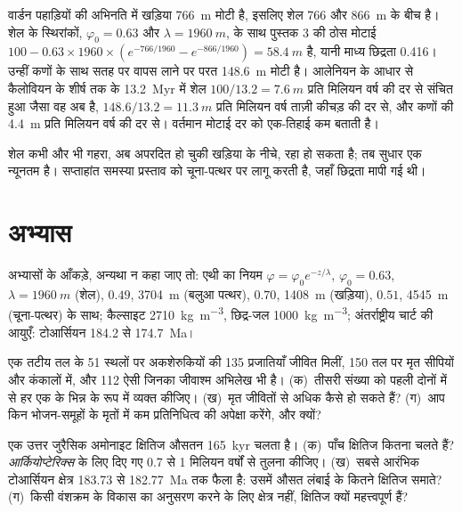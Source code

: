 \begin{example}[वार्डन शेल]\label{ex:b2:palaeoenvironments:shale}
वार्डन पहाड़ियों की अभिनति में खड़िया \qty{766}{m} मोटी है, इसलिए शेल
766 और \qty{866}{m} के बीच है। शेल के स्थिरांकों, $\varphi_0 = 0.63$ और $\lambda =
\qty{1960}{m}$, के साथ पुस्तक 3 की ठोस मोटाई $100 - 0.63 \times 1960 \times
(e^{-766/1960} - e^{-866/1960}) = \qty{58.4}{m}$ है, यानी माध्य छिद्रता 0.416। उन्हीं कणों के साथ
सतह पर वापस लाने पर परत \qty{148.6}{m} मोटी है। आलेनियन के आधार से कैलोवियन के शीर्ष तक के
\qty{13.2}{Myr} में शेल $100/13.2 =
\qty{7.6}{m}$ प्रति मिलियन वर्ष की दर से संचित हुआ जैसा वह अब है, $148.6/13.2 = \qty{11.3}{m}$ प्रति मिलियन
वर्ष ताज़ी कीचड़ की दर से, और कणों की \qty{4.4}{m} प्रति मिलियन वर्ष की दर से। वर्तमान मोटाई
दर को एक-तिहाई कम बताती है।
\end{example}

शेल कभी और भी गहरा, अब अपरदित हो चुकी खड़िया के नीचे, रहा हो सकता है; तब सुधार एक
न्यूनतम है। सप्ताहांत समस्या प्रस्ताव को चूना-पत्थर पर लागू करती है, जहाँ छिद्रता
मापी गई थी।

\section*{अभ्यास}\label{sec:b2:palaeoenvironments:exercises}

अभ्यासों के आँकड़े, अन्यथा न कहा जाए तो: एथी का नियम $\varphi = \varphi_0 e^{-z/\lambda}$,
$\varphi_0 = 0.63$, $\lambda = \qty{1960}{m}$ (शेल), $0.49$, \qty{3704}{m} (बलुआ पत्थर),
$0.70$, \qty{1408}{m} (खड़िया), $0.51$, \qty{4545}{m} (चूना-पत्थर) के साथ; कैल्साइट \qty{2710}{kg.m^{-3}},
छिद्र-जल \qty{1000}{kg.m^{-3}}; अंतर्राष्ट्रीय चार्ट की आयुएँ: टोआर्सियन 184.2 से
\qty{174.7}{Ma}।

\begin{exercise}[$\star$]\label{exo:b2:palaeoenvironments:1}
एक तटीय तल के 51 स्थलों पर अकशेरुकियों की 135 प्रजातियाँ जीवित मिलीं, 150 तल पर मृत
सीपियों और कंकालों में, और 112 ऐसी जिनका जीवाश्म अभिलेख भी है। (क)~तीसरी
संख्या को पहली दोनों में से हर एक के भिन्न के रूप में व्यक्त कीजिए। (ख)~मृत जीवितों से अधिक कैसे हो सकते हैं? (ग)~आप
किन भोजन-समूहों के मृतों में कम प्रतिनिधित्व की अपेक्षा करेंगे, और क्यों?
\end{exercise}

\begin{exercise}[$\star$]\label{exo:b2:palaeoenvironments:2}
एक उत्तर जुरैसिक अमोनाइट क्षितिज औसतन \qty{165}{kyr} चलता है। (क)~पाँच क्षितिज कितना
चलते हैं? \emph{आर्कियोप्टेरिक्स} के लिए दिए गए 0.7 से 1 मिलियन वर्षों से तुलना कीजिए। (ख)~सबसे आरंभिक
टोआर्सियन क्षेत्र 183.73 से \qty{182.77}{Ma} तक फैला है: उसमें औसत लंबाई के कितने क्षितिज समाते?
(ग)~किसी वंशक्रम के विकास का अनुसरण करने के लिए क्षेत्र नहीं, क्षितिज क्यों महत्त्वपूर्ण हैं?
\end{exercise}

